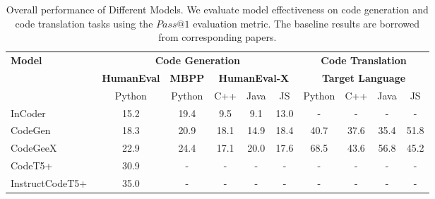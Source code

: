 \documentclass[11pt]{article}
\begin{document}
\begin{table*}[h]
\centering
\small
\caption{Overall performance of Different Models. We evaluate model effectiveness on code generation and code translation tasks using the $Pass@1$ evaluation metric. The baseline results are borrowed from corresponding papers.}
\label{tab:overall_code_gen}
\begin{tabular}{l|ccccc|cccc}
\hline
\multirow{3}{*}{\textbf{Model}} & \multicolumn{5}{c|}{\textbf{Code Generation}}                                                                                & \multicolumn{4}{c}{\textbf{Code Translation}}                 \\ \cline{2-10} 
                                & \multicolumn{1}{c|}{\textbf{HumanEval}} & \multicolumn{1}{c|}{\textbf{MBPP}} & \multicolumn{3}{c|}{\textbf{HumanEval-X}}     & \multicolumn{4}{c}{\textbf{Target Language}}                  \\
                                & \multicolumn{1}{c|}{Python}             & \multicolumn{1}{c|}{Python}        & C++           & Java          & JS            & Python        & C++           & Java          & JS            \\ \hline
InCoder~\cite{fried2022incoder}                         & \multicolumn{1}{c|}{15.2}               & \multicolumn{1}{c|}{19.4}          & 9.5           & 9.1           & 13.0          & -             & -             & -             & -             \\
CodeGen~\cite{nijkamp2022codegen}                         & \multicolumn{1}{c|}{18.3}               & \multicolumn{1}{c|}{20.9}          & 18.1          & 14.9          & 18.4          & 40.7          & 37.6          & 35.4          & 51.8         \\
CodeGeeX~\cite{zheng2023codegeex}                        & \multicolumn{1}{c|}{22.9}               & \multicolumn{1}{c|}{24.4}          & 17.1          & 20.0          & 17.6          & 68.5 & 43.6          &56.8          &45.2         \\
CodeT5+~\cite{wang2023codet5+}                         & \multicolumn{1}{c|}{30.9}               & \multicolumn{1}{c|}{-}             & -             & -             & -             & -             & -             & -             & -             \\
InstructCodeT5+~\cite{wang2023codet5+}                 & \multicolumn{1}{c|}{35.0}               & \multicolumn{1}{c|}{-}             & -             & -             & -             & -             & -             & -             & -             \\

\end{tabular}
\end{table*}
\end{document}

